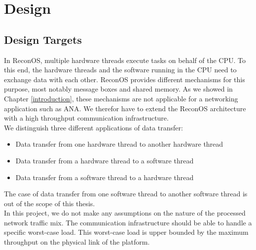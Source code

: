 \chapter{\label{design}Design}

\section{Design Targets}

In ReconOS, multiple hardware threads execute tasks on behalf of the CPU. To this end, the hardware threads and the software running in the CPU need to exchange data with each other. ReconOS provides different mechanisms for this purpose, most notably message boxes and shared memory. As we showed in Chapter \ref{introduction}, these mechanisms are not applicable for a networking application such as ANA. We therefor have to extend the ReconOS architecture with a high throughput communication infrastructure.\\
We distinguish three different applications of data transfer:
\begin{itemize}
	\item Data transfer from one hardware thread to another hardware thread
	\item Data transfer from a hardware thread to a software thread
	\item Data transfer from a software thread to a hardware thread
\end{itemize}

The case of data transfer from one software thread to another software thread is out of the scope of this thesis.\\
In this project, we do not make any assumptions on the nature of the processed network traffic mix. The communication infrastructure should be able to handle a specific worst-case load. This worst-case load is upper bounded by the maximum throughput on the physical link of the platform. 